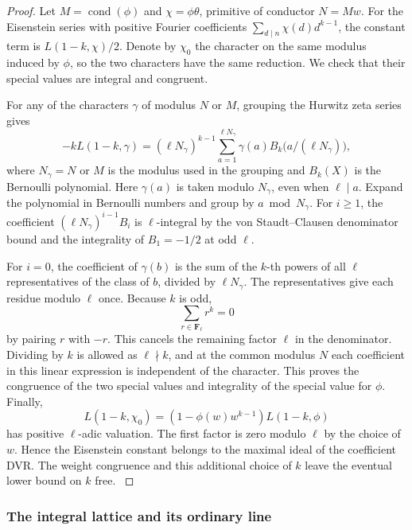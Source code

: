 \begin{proof}
Let \(M=\operatorname{cond}(\phi)\) and
\(\chi=\phi\theta\), primitive of conductor \(N=Mw\).
For the Eisenstein series with positive Fourier
coefficients \(\sum_{d\mid n}\chi(d)d^{k-1}\), the
constant term is \(L(1-k,\chi)/2\).
Denote by \(\chi_0\) the character on the same
modulus induced by \(\phi\), so the two characters
have the same reduction. We check that their
special values are integral and congruent.

For any of the characters \(\gamma\) of modulus \(N\)
or \(M\), grouping the Hurwitz zeta series gives
\[
 -k L(1-k,\gamma)=
  (\ell N_\gamma)^{k-1}
       \sum_{a=1}^{\ell N_\gamma}
          \gamma(a) B_k\bigl(a/(\ell N_\gamma)\bigr),
\]
where \(N_\gamma=N\) or \(M\) is the modulus used
in the grouping and \(B_k(X)\) is the Bernoulli
polynomial. Here \(\gamma(a)\) is taken modulo
\(N_\gamma\), even when \(\ell\mid a\).
Expand the polynomial in Bernoulli numbers and
group by \(a\bmod N_\gamma\).
For \(i\ge1\), the coefficient
\((\ell N_\gamma)^{i-1}B_i\) is \(\ell\)-integral by
the von Staudt--Clausen denominator bound and
the integrality of \(B_1=-1/2\) at odd \(\ell\).

For \(i=0\), the coefficient of \(\gamma(b)\)
is the sum of the \(k\)-th powers of all
\(\ell\) representatives of the class of \(b\),
divided by \(\ell N_\gamma\).
The representatives give each residue modulo \(\ell\) once.
Because \(k\) is odd,
\[
          \sum_{r\in\mathbf F_\ell}r^k=0
\]
by pairing \(r\) with \(-r\). This cancels the remaining
factor \(\ell\) in the denominator.
Dividing by \(k\) is allowed as \(\ell\nmid k\),
and at the common modulus \(N\) each coefficient
in this linear expression is independent of
the character. This proves the congruence
of the two special values and integrality of
the special value for \(\phi\).
Finally,
\[
 L(1-k,\chi_0)
     =(1-\phi(w)w^{k-1})L(1-k,\phi)
\]
has positive \(\ell\)-adic valuation. The first
factor is zero modulo \(\ell\) by the choice of
\(w\). Hence the Eisenstein constant belongs to
the maximal ideal of the coefficient DVR.
The weight congruence and this additional choice
of \(k\) leave the eventual lower bound on \(k\) free.
\hfill\mbox{\cite{washington-cyclo,bernoulli-values}}\label{cor:ordinary-count-iii-seed-1}

\end{proof}



\subsubsection{The integral lattice and its ordinary line}

